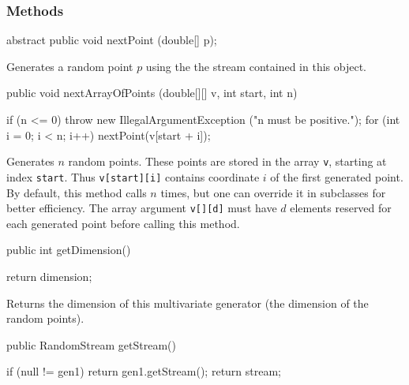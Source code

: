 \subsubsection* {Methods}
\begin{code}

   abstract public void nextPoint (double[] p);
\end{code}
  \begin{tabb} Generates a random point $p$ using the
  the stream contained in this object.
 \end{tabb}
\begin{code}

   public void nextArrayOfPoints (double[][] v, int start, int n) \begin{hide} {
      if (n <= 0)
         throw new IllegalArgumentException ("n must be positive.");
      for (int i = 0; i < n; i++)
         nextPoint(v[start + i]);
   }\end{hide}
\end{code}
\begin{tabb}
   Generates $n$ random points. These points are stored in
   the array \texttt{v}, starting at index \texttt{start}. Thus
   \texttt{v[start][i]} contains
   coordinate $i$ of the first generated point.
   By default, this method calls  $n$
   times, but one can override it in subclasses for better efficiency.
   The array argument \texttt{v[][d]} must have $d$ elements reserved
   for each generated point before calling this method.
 \end{tabb}
\begin{htmlonly}
\end{htmlonly}
\begin{code}

   public int getDimension()\begin{hide} {
      return dimension;
   }\end{hide}
\end{code}
\begin{tabb}
   Returns the dimension of this multivariate generator
  (the dimension of the random points).
\end{tabb}
\begin{code}

   public RandomStream getStream() \begin{hide} {
      if (null != gen1)
         return gen1.getStream();
      return stream;
   }\end{hide}
\end{code}
